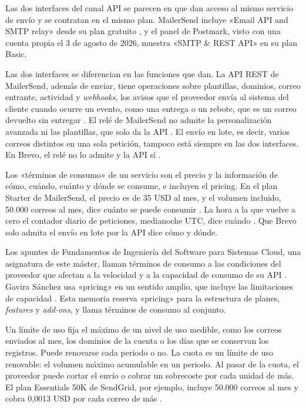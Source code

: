 Las dos interfaces del canal API se parecen en que dan acceso al mismo
servicio de envío y se contratan en el mismo plan. MailerSend incluye «Email
API and SMTP relay» desde su plan gratuito \citep{mailersendpricing}, y el
panel de Postmark, visto con una cuenta propia el 3 de agosto de 2026, muestra
«SMTP \& REST API» en su plan Basic.

Las dos interfaces se diferencian en las funciones que dan. La API REST de
MailerSend, además de enviar, tiene operaciones sobre plantillas, dominios,
correo entrante, actividad y \textit{webhooks}, los avisos que el proveedor envía al sistema
del cliente cuando ocurre un evento, como una entrega o un rebote, que es un
correo devuelto sin entregar \citep{mailersendapi}. El relé de MailerSend no
admite la personalización avanzada ni las plantillas, que solo da la API
\citep{mailersendsmtpdocs}. El envío en lote, es decir, varios correos
distintos en una sola petición, tampoco está siempre en las dos interfaces.
En Brevo, el relé no lo admite y la API sí \citep{brevosmtp}.

Los «términos de consumo» de un servicio son el precio y la información de cómo,
cuándo, cuánto y dónde se consume, e incluyen el pricing. En el plan Starter
de MailerSend, el precio es de 35 USD al mes, y el volumen incluido, 50.000
correos al mes, dice cuánto se puede consumir \citep{mailersendpricing}. La
hora a la que vuelve a cero el contador diario de peticiones, medianoche UTC,
dice cuándo \citep{mailersenddocs}. Que Brevo solo admita el envío en lote por
la API dice cómo y dónde.

Los apuntes de Fundamentos de Ingeniería del Software para Sistemas Cloud,
una asignatura de este máster, llaman términos de consumo a las condiciones
del proveedor que afectan a la velocidad y a la capacidad de consumo de su
API \citep{fisapuntes}.
Gavira Sánchez usa
«pricing» en un sentido amplio, que incluye las limitaciones de capacidad
\citep{gavira2026tfm}. Esta memoria reserva «pricing» para la estructura de
planes, \textit{features} y \textit{add-ons}, y llama términos de consumo al
conjunto.

Un límite de uso fija el máximo de un nivel de uso medible, como los correos
enviados al mes, los dominios de la cuenta o los días que se conservan los
registros. Puede renovarse cada periodo o no. La cuota es un límite de uso
renovable: el volumen máximo acumulable en un periodo. Al pasar de la cuota,
el proveedor puede cortar el envío o cobrar un sobrecoste por cada unidad de
más. El plan Essentials 50K de SendGrid, por ejemplo, incluye 50.000 correos
al mes y cobra 0,0013 USD por cada correo de más \citep{sendgridpricing}.

